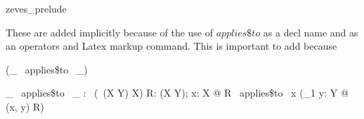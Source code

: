 \begin{zsection}
  \SECTION zeves\_prelude
\end{zsection}





These are added implicitly because of the use of $applies\$to$ as a decl name and as an 
operators and Latex markup command. This is important to add because
%
\begin{zed}
   \relation (\_ ~applies\$to~ \_)
\end{zed}

\begin{gendef}[X, Y]
   \_ ~applies\$to~ \_ : \power~(\power~(X \cross Y) \cross X)
\where
   \forall R: \power(X \cross Y); x: X @ R ~applies\$to~ x \iff (\exists_1 y: Y @ (x, y) \in R)
\end{gendef}
